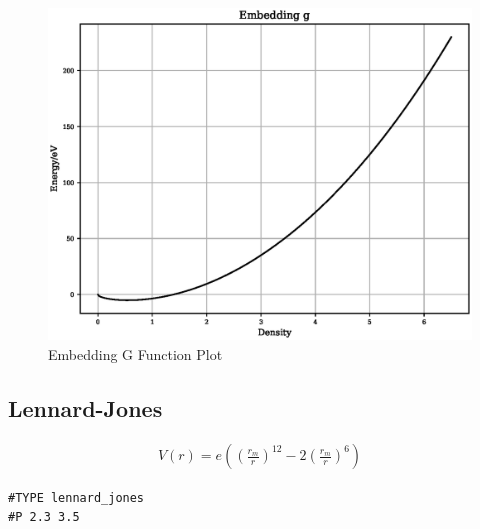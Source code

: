 \FloatBarrier
\begin{figure}[h]
  \begin{center}
    \includegraphics[scale=0.5]{appendix/functions/plots/embedding_g.eps}
    \caption{Embedding G Function Plot}
    \label{graph:embeddingGPlot}
  \end{center}
\end{figure}

\FloatBarrier




\FloatBarrier









\subsection{Lennard-Jones}

\begin{equation}
\begin{split}
V(r) = e \left(\left(\frac{r_m}{r}\right)^{12} - 2 \left(\frac{r_m}{r}\right)^6\right)
\end{split}
\label{eq:eqLennardJones}
\end{equation}

\begin{lstlisting}[style=pseudocode,caption={Lennard-Jones}]
#TYPE lennard_jones
#P 2.3 3.5
\end{lstlisting}

